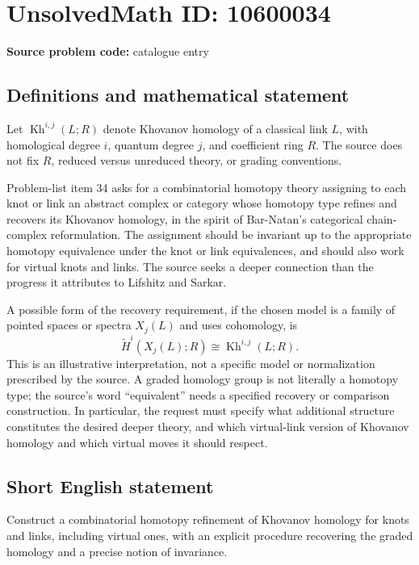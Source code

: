 \documentclass[11pt]{article}
\begin{document}
\section*{UnsolvedMath ID: 10600034}
\textbf{Source problem code:} catalogue entry
\subsection{Definitions and mathematical statement}
Let $\operatorname{Kh}^{i,j}(L;R)$ denote Khovanov homology of a classical link $L$, with homological degree $i$, quantum degree $j$, and coefficient ring $R$. The source does not fix $R$, reduced versus unreduced theory, or grading conventions.

Problem-list item 34 asks for a combinatorial homotopy theory assigning to each knot or link an abstract complex or category whose homotopy type refines and recovers its Khovanov homology, in the spirit of Bar-Natan's categorical chain-complex reformulation. The assignment should be invariant up to the appropriate homotopy equivalence under the knot or link equivalences, and should also work for virtual knots and links. The source seeks a deeper connection than the progress it attributes to Lifshitz and Sarkar.

A possible form of the recovery requirement, if the chosen model is a family of pointed spaces or spectra $X_j(L)$ and uses cohomology, is
\[
 \widetilde H^i(X_j(L);R)\cong \operatorname{Kh}^{i,j}(L;R).
\]
This is an illustrative interpretation, not a specific model or normalization prescribed by the source. A graded homology group is not literally a homotopy type; the source's word ``equivalent'' needs a specified recovery or comparison construction. In particular, the request must specify what additional structure constitutes the desired deeper theory, and which virtual-link version of Khovanov homology and which virtual moves it should respect.
\subsection{Short English statement}
Construct a combinatorial homotopy refinement of Khovanov homology for knots and links, including virtual ones, with an explicit procedure recovering the graded homology and a precise notion of invariance.
\end{document}
